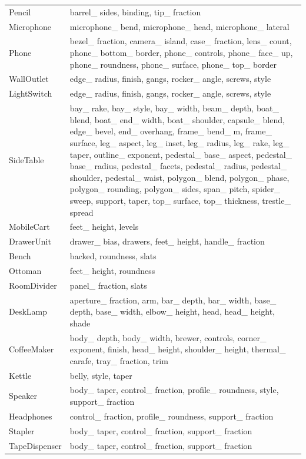 \begin{longtable}{p{.20\linewidth}p{.74\linewidth}}
Pencil & barrel\_ sides, binding, tip\_ fraction \\
Microphone & microphone\_ bend, microphone\_ head, microphone\_ lateral \\
Phone & bezel\_ fraction, camera\_ island, case\_ fraction, lens\_ count, phone\_ bottom\_ border, phone\_ controls, phone\_ face\_ up, phone\_ roundness, phone\_ surface, phone\_ top\_ border \\
WallOutlet & edge\_ radius, finish, gangs, rocker\_ angle, screws, style \\
LightSwitch & edge\_ radius, finish, gangs, rocker\_ angle, screws, style \\
SideTable & bay\_ rake, bay\_ style, bay\_ width, beam\_ depth, boat\_ blend, boat\_ end\_ width, boat\_ shoulder, capsule\_ blend, edge\_ bevel, end\_ overhang, frame\_ bend\_ m, frame\_ surface, leg\_ aspect, leg\_ inset, leg\_ radius, leg\_ rake, leg\_ taper, outline\_ exponent, pedestal\_ base\_ aspect, pedestal\_ base\_ radius, pedestal\_ facets, pedestal\_ radius, pedestal\_ shoulder, pedestal\_ waist, polygon\_ blend, polygon\_ phase, polygon\_ rounding, polygon\_ sides, span\_ pitch, spider\_ sweep, support, taper, top\_ surface, top\_ thickness, trestle\_ spread \\
MobileCart & feet\_ height, levels \\
DrawerUnit & drawer\_ bias, drawers, feet\_ height, handle\_ fraction \\
Bench & backed, roundness, slats \\
Ottoman & feet\_ height, roundness \\
RoomDivider & panel\_ fraction, slats \\
DeskLamp & aperture\_ fraction, arm, bar\_ depth, bar\_ width, base\_ depth, base\_ width, elbow\_ height, head, head\_ height, shade \\
CoffeeMaker & body\_ depth, body\_ width, brewer, controls, corner\_ exponent, finish, head\_ height, shoulder\_ height, thermal\_ carafe, tray\_ fraction, trim \\
Kettle & belly, style, taper \\
Speaker & body\_ taper, control\_ fraction, profile\_ roundness, style, support\_ fraction \\
Headphones & control\_ fraction, profile\_ roundness, support\_ fraction \\
Stapler & body\_ taper, control\_ fraction, support\_ fraction \\
TapeDispenser & body\_ taper, control\_ fraction, support\_ fraction \\

\end{longtable}
